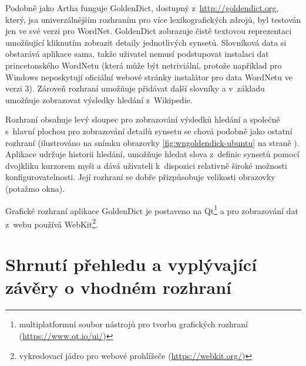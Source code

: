 \documentclass[a4paper,11pt,openany,twoside]{book}
\begin{document}
				Podobně jako Artha funguje GoldenDict, dostupný z~\url{http://goldendict.org}, který, jsa univerzálnějším rozhraním pro více lexikografických zdrojů, byl testován jen ve své verzi pro WordNet. GoldenDict zobrazuje čistě textovou reprezentaci umožňující kliknutím zobrazit detaily jednotlivých synsetů. Slovníková data si obstarává aplikace sama, takže uživatel nemusí podstupovat instalaci dat princetonského WordNetu (která může být netriviální, protože například pro Windows neposkytují oficiální webové stránky instalátor pro data WordNetu ve verzi 3). Zároveň rozhraní umožňuje přidávat další slovníky a v~základu umožňuje zobrazovat výsledky hledání z~Wikipedie. 

				Rozhraní obsahuje levý sloupec pro zobrazování výsledků hledání a společně s~hlavní plochou pro zobrazování detailů synsetu se chová podobně jako ostatní rozhraní (ilustrováno na snímku obrazovky \ref{fig:wngoldendick-ubuntu} na straně \pageref{fig:wngoldendick-ubuntu}). Aplikace udržuje historii hledání, umožňuje hledat slova z~definic synsetů pomocí dvojkliku kurzorem myši a dává uživateli k~dispozici relativně široké možnosti konfigurovatelnosti. Její rozhraní se dobře přizpůsobuje velikosti obrazovky (potažmo okna).

				Grafické rozhraní aplikace GoldenDict je postaveno na Qt\footnote{multiplatformní soubor nástrojů pro tvorbu grafických rozhraní (\url{https://www.qt.io/ui/})} a pro zobrazování dat z~webu používá WebKit\footnote{vykreslovací jádro pro webové prohlížeče (\url{https://webkit.org/})}. \parencite{goldendict2016}


		\chapter{Shrnutí přehledu a vyplývající závěry o vhodném rozhraní}
		\label{cha:shrnuti-prehledu}

\end{document}
